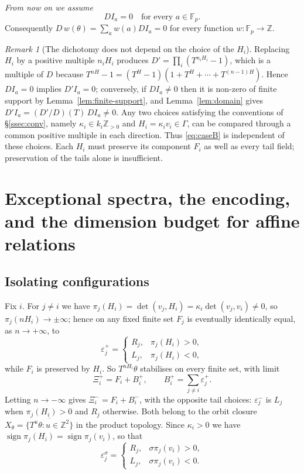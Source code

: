 \documentclass[11pt,reqno]{amsart}
\theoremstyle{plain}
\theoremstyle{definition}
\theoremstyle{remark}
\newtheorem{rem}[thm]{Remark}
\theoremstyle{plain}
\theoremstyle{remark}
\theoremstyle{definition}
\numberwithin{equation}{section}
\DeclareMathOperator{\sgn}{sign}
\newcommand{\Z}{\mathbb{Z}}
\newcommand{\Fp}{\mathbb{F}_p}
\begin{document}
\noindent\emph{From now on we assume}
\begin{equation}
DI_a=0\quad\text{for every }a\in\Fp. \label{eq:caseB}
\end{equation}
Consequently $D\,w(\theta)=\sum_aw(a)DI_a=0$ for every function
$w\colon\Fp\to\Z$.

\begin{rem}[The dichotomy does not depend on the choice of the $H_i$]
\label{rem:dichotomy-stable}
Replacing $H_i$ by a positive multiple $n_iH_i$ produces
$D'=\prod_i(T^{n_iH_i}-1)$, which is a multiple of $D$ because
$T^{nH}-1=(T^H-1)(1+T^H+\cdots+T^{(n-1)H})$.  Hence $DI_a=0$ implies
$D'I_a=0$; conversely, if $DI_a\ne0$ then it is non-zero of finite support by
Lemma~\ref{lem:finite-support}, and Lemma~\ref{lem:domain} gives
$D'I_a=(D'/D)(T)\,DI_a\ne0$.  Any two choices satisfying the conventions of
\S\ref{ssec:conv}, namely $\kappa_i\in k_i\Z_{>0}$ and
$H_i=\kappa_iv_i\in\Gamma$, can be compared through a common positive
multiple in each direction.  Thus \eqref{eq:caseB} is independent of these
choices.  Each $H_i$ must preserve its component $F_i$ as well as every tail
field; preservation of the tails alone is insufficient.
\end{rem}

\section{Exceptional spectra, the encoding, and the dimension budget for
affine relations}\label{sec:spectrum}

\setcounter{thm}{-1}
\setcounter{equation}{-1}%
\subsection{Isolating configurations}\label{ssec:isolating}

Fix $i$.  For $j\ne i$ we have
$\pi_j(H_i)=\det(v_j,H_i)=\kappa_i\det(v_j,v_i)\ne0$, so
$\pi_j(nH_i)\to\pm\infty$; hence on any fixed finite set $F_j$ is eventually
identically equal, as $n\to+\infty$, to
\[\varepsilon_j^+=\begin{cases}R_j,&\pi_j(H_i)>0,\\
                               L_j,&\pi_j(H_i)<0,\end{cases}\]
while $F_i$ is preserved by $H_i$.  So $T^{nH_i}\theta$ stabilises on every
finite set, with limit
\[\Xi_i^+=F_i+B_i^+,\qquad B_i^+=\sum_{j\ne i}\varepsilon_j^+ .\]
Letting $n\to-\infty$ gives $\Xi_i^-=F_i+B_i^-$, with the opposite tail
choices: $\varepsilon_j^-$ is $L_j$ when $\pi_j(H_i)>0$ and $R_j$ otherwise.
Both belong to the orbit closure $X_\theta=\overline{\{T^u\theta:u\in\Z^2\}}$ in
the product topology.  Since $\kappa_i>0$ we have
$\sgn\pi_j(H_i)=\sgn\pi_j(v_i)$, so that
\begin{equation}
\varepsilon_j^\sigma=\begin{cases}R_j,&\sigma\pi_j(v_i)>0,\\
                                  L_j,&\sigma\pi_j(v_i)<0.\end{cases}
\label{eq:tailchoice}
\end{equation}
\end{document}
